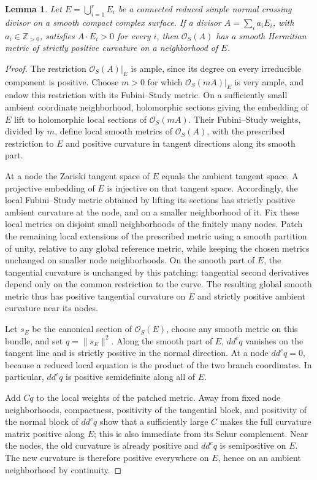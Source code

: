 \documentclass[11pt]{amsart}
\newtheorem{lemma}[theorem]{Lemma}
\theoremstyle{definition}
\theoremstyle{remark}
\numberwithin{equation}{section}
\newcommand{\OO}{\mathcal O}
\newcommand{\ddc}{dd^c}
\begin{document}
\begin{lemma}\label{lem:surface-positive-boundary-metric}
Let $E=\bigcup_{i=1}^rE_i$ be a connected reduced simple normal crossing
divisor on a smooth compact complex surface.  If a divisor
$A=\sum_i a_iE_i$, with $a_i\in\mathbb Z_{>0}$, satisfies
$A\cdot E_i>0$ for every $i$, then $\OO_S(A)$ has a smooth Hermitian
metric of strictly positive curvature on a neighborhood of $E$.
\end{lemma}
\begin{proof}
The restriction $\OO_S(A)|_E$ is ample, since its degree on every
irreducible component is positive.  Choose $m>0$ for which
$\OO_S(mA)|_E$ is very ample, and endow this restriction with its
Fubini--Study metric.  On a sufficiently small ambient coordinate
neighborhood, holomorphic sections giving the embedding of $E$ lift to
holomorphic local sections of $\OO_S(mA)$.  Their Fubini--Study weights,
divided by $m$, define local smooth metrics of $\OO_S(A)$, with the
prescribed restriction to $E$ and positive curvature in tangent
directions along its smooth part.

At a node the Zariski tangent space of $E$ equals the ambient tangent
space.  A projective embedding of $E$ is injective on that tangent
space.  Accordingly, the local Fubini--Study metric obtained by lifting
its sections has strictly positive ambient curvature at the node, and
on a smaller neighborhood of it.  Fix these local metrics on disjoint
small neighborhoods of the finitely many nodes.  Patch the remaining
local extensions of the prescribed metric using a smooth partition of
unity, relative to any global reference metric, while keeping the
chosen metrics unchanged on smaller node neighborhoods.  On the
smooth part of $E$, the tangential curvature is unchanged by this
patching: tangential second derivatives depend only on the common
restriction to the curve.  The resulting global smooth metric thus has
positive tangential curvature on $E$ and strictly positive ambient
curvature near its nodes.

Let $s_E$ be the canonical section of $\OO_S(E)$, choose any smooth
metric on this bundle, and set $q=\|s_E\|^2$.  Along the smooth part of
$E$, $\ddc q$ vanishes on the tangent line and is strictly positive in
the normal direction.  At a node $\ddc q=0$, because a reduced local
equation is the product of the two branch coordinates.  In particular,
$\ddc q$ is positive semidefinite along all of $E$.

Add $Cq$ to the local weights of the patched metric.  Away from fixed
node neighborhoods, compactness, positivity of the tangential block,
and positivity of the normal block of $\ddc q$ show that a sufficiently
large $C$ makes the full curvature matrix positive along $E$; this is
also immediate from its Schur complement.  Near the nodes, the old
curvature is already positive and $\ddc q$ is semipositive on $E$.
The new curvature is therefore positive everywhere on $E$, hence on
an ambient neighborhood by continuity.
\end{proof}
\end{document}
